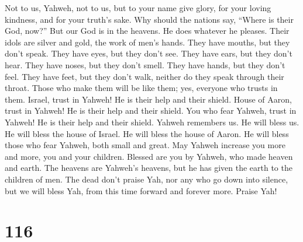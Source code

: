  Not to us, Yahweh, not to us, but to your name give glory,
for your loving kindness, and for your truth's sake.  Why
should the nations say, ``Where is their God, now?''  But
our God is in the heavens. He does whatever he pleases. 
Their idols are silver and gold, the work of men's hands. 
They have mouths, but they don't speak. They have eyes, but they don't
see.  They have ears, but they don't hear. They have noses,
but they don't smell.  They have hands, but they don't feel.
They have feet, but they don't walk, neither do they speak through their
throat.  Those who make them will be like them; yes,
everyone who trusts in them.  Israel, trust in Yahweh! He is
their help and their shield.  House of Aaron, trust in
Yahweh! He is their help and their shield.  You who fear
Yahweh, trust in Yahweh! He is their help and their shield.
 Yahweh remembers us. He will bless us. He will bless the
house of Israel. He will bless the house of Aaron.  He will
bless those who fear Yahweh, both small and great.  May
Yahweh increase you more and more, you and your children. 
Blessed are you by Yahweh, who made heaven and earth.  The
heavens are Yahweh's heavens, but he has given the earth to the children
of men.  The dead don't praise Yah, nor any who go down
into silence,  but we will bless Yah, from this time
forward and forever more. Praise Yah!

\hypertarget{section-106}{%
\section{116}\label{section-106}}

